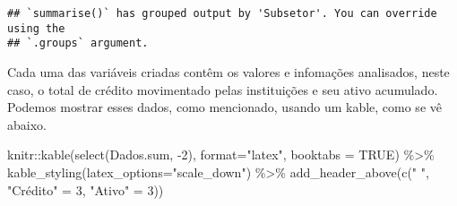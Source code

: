 \documentclass[
]{article}
\newenvironment{Shaded}{\begin{snugshade}}{\end{snugshade}}
\newcommand{\AttributeTok}[1]{\textcolor[rgb]{0.77,0.63,0.00}{#1}}
\newcommand{\ConstantTok}[1]{\textcolor[rgb]{0.00,0.00,0.00}{#1}}
\newcommand{\DecValTok}[1]{\textcolor[rgb]{0.00,0.00,0.81}{#1}}
\newcommand{\FunctionTok}[1]{\textcolor[rgb]{0.00,0.00,0.00}{#1}}
\newcommand{\NormalTok}[1]{#1}
\newcommand{\OtherTok}[1]{\textcolor[rgb]{0.56,0.35,0.01}{#1}}
\newcommand{\SpecialCharTok}[1]{\textcolor[rgb]{0.00,0.00,0.00}{#1}}
\newcommand{\StringTok}[1]{\textcolor[rgb]{0.31,0.60,0.02}{#1}}
\begin{document}
\begin{verbatim}
## `summarise()` has grouped output by 'Subsetor'. You can override using the
## `.groups` argument.
\end{verbatim}

Cada uma das variáveis criadas contêm os valores e infomações
analisados, neste caso, o total de crédito movimentado pelas
instituições e seu ativo acumulado. Podemos mostrar esses dados, como
mencionado, usando um kable, como se vê abaixo.

\begin{Shaded}
\begin{Highlighting}[]
\NormalTok{knitr}\SpecialCharTok{::}\FunctionTok{kable}\NormalTok{(}\FunctionTok{select}\NormalTok{(Dados.sum, }\SpecialCharTok{{-}}\DecValTok{2}\NormalTok{), }\AttributeTok{format=}\StringTok{"latex"}\NormalTok{, }\AttributeTok{booktabs =} \ConstantTok{TRUE}\NormalTok{) }\SpecialCharTok{\%\textgreater{}\%} 
  \FunctionTok{kable\_styling}\NormalTok{(}\AttributeTok{latex\_options=}\StringTok{"scale\_down"}\NormalTok{) }\SpecialCharTok{\%\textgreater{}\%}
  \FunctionTok{add\_header\_above}\NormalTok{(}\FunctionTok{c}\NormalTok{(}\StringTok{" "}\NormalTok{, }\StringTok{"Crédito"} \OtherTok{=} \DecValTok{3}\NormalTok{, }\StringTok{"Ativo"} \OtherTok{=} \DecValTok{3}\NormalTok{)) }
\end{Highlighting}
\end{Shaded}
\end{document}
